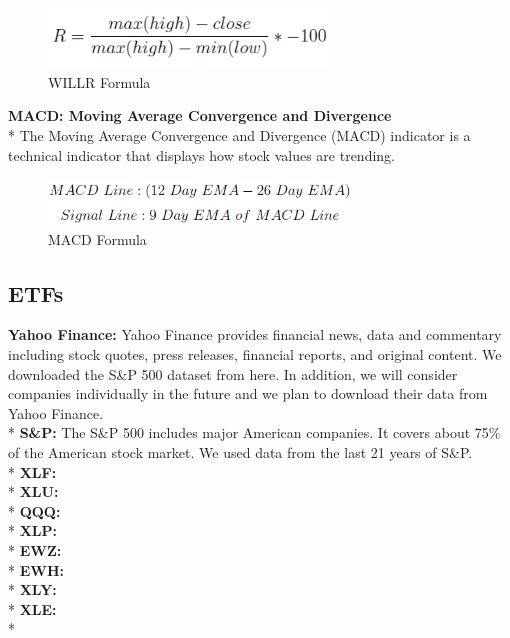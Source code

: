 \documentclass{article}
\begin{document}
\begin{figure}[H]
\begin{center}
    \includegraphics[width=75mm,scale=0.8]{assets/formulas/willr.png}
    \caption{WILLR Formula}
\end{center}
\end{figure}
\noindent
\textbf{MACD: Moving Average Convergence and Divergence} \\*
The Moving Average Convergence and Divergence (MACD) indicator is a technical indicator that displays how stock values are trending.
\begin{figure}[H]
\begin{center}
    \includegraphics[width=80mm,scale=0.8]{assets/formulas/macd.png}
    \caption{MACD Formula}
\end{center}
\end{figure}

\subsection{ETFs}
\textbf{Yahoo Finance:} Yahoo Finance provides financial news, data and commentary including stock quotes, press releases, financial reports, and original content. We downloaded the S\&P 500 dataset from here. In addition, we will consider companies individually in the future and we plan to download their data from Yahoo Finance.\vspace{0.1cm}\\*
\textbf{S\&P:} The S\&P 500 includes major American companies. It covers about 75\% of the American stock market. We used data from the last 21 years of S\&P.\vspace{0.1cm}\\*
\textbf{XLF:} \vspace{0.1cm}\\*
\textbf{XLU:} \vspace{0.1cm}\\*
\textbf{QQQ:} \vspace{0.1cm}\\*
\textbf{XLP:} \vspace{0.1cm}\\*
\textbf{EWZ:} \vspace{0.1cm}\\*
\textbf{EWH:} \vspace{0.1cm}\\*
\textbf{XLY:} \vspace{0.1cm}\\*
\textbf{XLE:} \vspace{0.1cm}\\*
\noindent
\end{document}
